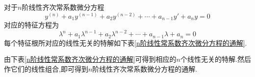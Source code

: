 \theorem[$n$阶线性常系数齐次微分方程的通解]
对于$n$阶线性齐次常系数微分方程
\begin{equation}
y^{(n)}+a_1y^{(n-1)}+a_2y^{(n-2)}+\cdots+a_{n-1}y'+a_ny=0
\end{equation}
对应的特征方程为
\begin{equation}
\lambda^n+a_1\lambda^{n-1}+a_2\lambda^{n-2}+\cdots +a_{n-1}\lambda +a_n=0
\end{equation}
每个特征根所对应的线性无关的特解如下表\ref{n阶线性常系数齐次微分方程的通解}.
\begin{table}[!htb]
	\centering
	\renewcommand{\arraystretch}{1}
	\caption{$n$阶线性常系数齐次微分方程的通解}
	\renewcommand{\arraystretch}{1}
	\label{n阶线性常系数齐次微分方程的通解}
\end{table} 
\par 由下表\ref{n阶线性常系数齐次微分方程的通解}可得到相应的$n$个线性无关的特解.然后作它们的线性组合,即可得到$n$阶线性齐次常系数微分方程的通解.

